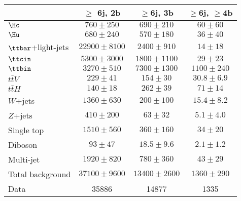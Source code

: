 \begin{table}[htbp]
\begin{center}
\begin{tabular}{l*{3}{c}}
\hline\hline
 & $\geq$ 6j, 2b & $\geq$6j, 3b & $\geq$6j, $\geq$4b \\
\hline
$\Hc$ & $ 760 \pm 250 $ &   $ 690 \pm 210 $ &   $ 60 \pm 60 $ \\ 
$\Hu$ & $ 680 \pm 240 $ &   $ 570 \pm 180 $ &   $ 36 \pm 40 $ \\ 
\hline
$\ttbar$+light-jets  &   $ 22900 \pm 8100 $ &   $ 2400 \pm 910 $ &   $ 14 \pm 18 $ \\ 
$\ttcin$  &   $ 5300 \pm 3000 $ &   $ 1800 \pm 1100 $ &   $ 29 \pm 23 $ \\ 
$\ttbin$  &   $ 3270 \pm 510 $ &   $ 7300 \pm 1300 $ &   $ 1100 \pm 240 $ \\ 
$t\bar{t}V$  &   $ 229 \pm 41 $ &   $ 154 \pm 30 $ &   $ 30.8 \pm 6.9 $ \\ 
$t\bar{t}H$  &   $ 140 \pm 18 $ &   $ 262 \pm 39 $ &   $ 71 \pm 14 $ \\ 
$W$+jets  &   $ 1360 \pm 630 $ &   $ 200 \pm 100 $ &   $ 15.4 \pm 8.2 $ \\ 
$Z$+jets  &   $ 410 \pm 200 $ &   $ 63 \pm 32 $ &   $ 5.1 \pm 4.0 $ \\ 
Single top  &   $ 1510 \pm 560 $ &   $ 360 \pm 160 $ &   $ 34 \pm 20 $ \\ 
Diboson  &   $ 93 \pm 47 $ &   $ 18.5 \pm 9.6 $ &   $ 2.1 \pm 1.2 $ \\ 
Multi-jet  &   $ 1920 \pm 820 $ &   $ 780 \pm 360 $ &   $ 43 \pm 29 $ \\ 
\hline
Total background &  $ 37100 \pm 9600 $ &   $ 13400 \pm 2600 $ &   $ 1360 \pm 290 $ \\ 
\hline
Data & 35886  & 14877  & 1335  \\ 
\hline\hline    
\end{tabular}

%
\end{center}
\label{tab:Hbb_Prefit_Yields_Unblind}
\end{table} 


